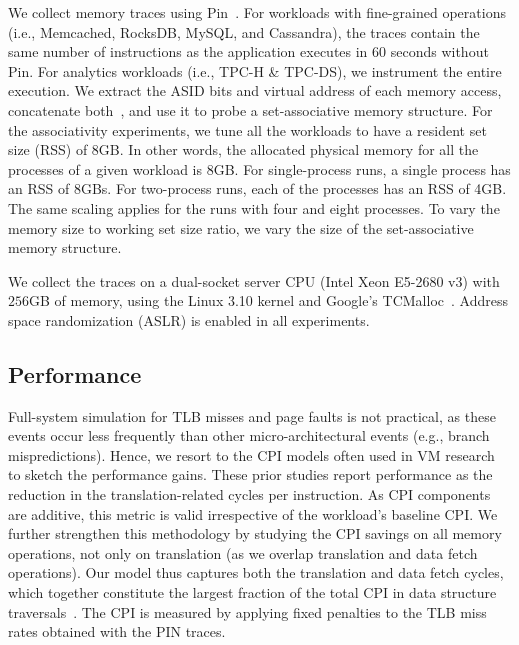 We collect memory traces using Pin~\cite{luk:pin}. For workloads with fine-grained operations (i.e., Memcached, RocksDB, MySQL, and Cassandra), the traces contain the same number of instructions as the application executes in 60 seconds without Pin. For analytics workloads (i.e., TPC-H \& TPC-DS), we instrument the entire execution. We extract the ASID bits and virtual address of each memory access, concatenate both~\cite{basu:reducing, yoon:revisiting},  and use it to probe a set-associative memory structure. For the associativity experiments, we tune all the workloads to have a resident set size (RSS) of 8GB. In other words, the allocated physical memory for all the processes of a given workload is 8GB. For single-process runs, a single process has an RSS of 8GBs. For two-process runs, each of the processes has an RSS of 4GB. The same scaling applies for the runs with four and eight processes. To vary the memory size to working set size ratio, we vary the size of the set-associative memory structure. 


We collect the traces on a dual-socket server CPU (Intel Xeon E5-2680 v3) with $256$GB of memory, using the Linux 3.10 kernel and Google's TCMalloc~\cite{google:tcmalloc}. Address space randomization (ASLR) is enabled in all experiments.

\subsection{Performance}


Full-system simulation for TLB misses and page faults is not practical, as these events occur less frequently than other micro-architectural events (e.g., branch mispredictions). Hence, we resort to the CPI models often used in VM research~\cite{papadopoulou:prediction-based, saulsbury:recently-based, bhattacharjee:shared} to sketch the performance gains. These prior studies report performance as the reduction in the translation-related cycles per instruction. As CPI components are additive, this metric is valid irrespective of the workload's baseline CPI. We further strengthen this methodology by studying the CPI savings on all memory operations, not only on translation (as we overlap translation and data fetch operations). Our model thus captures both the translation and data fetch cycles, which together constitute the largest fraction of the total CPI in data structure traversals~\cite{picorel:near-memory}. The CPI is measured by applying fixed penalties to the TLB miss rates obtained with the PIN traces. 

